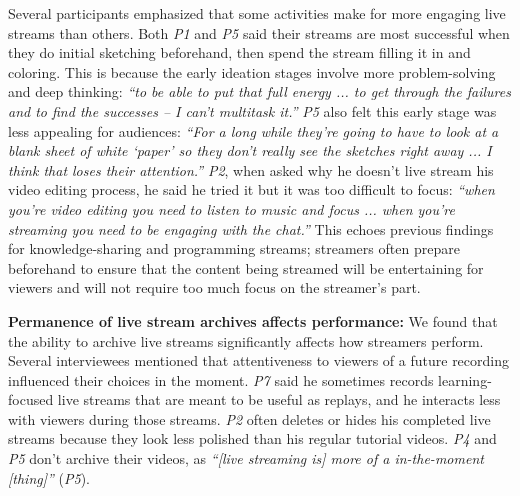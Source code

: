 Several participants emphasized that some activities make for more engaging live streams than others. Both \textit{P1} and \textit{P5} said their streams are most successful when they do initial sketching beforehand, then spend the stream filling it in and coloring. This is because the early ideation stages involve more problem-solving and deep thinking: \textit{``to be able to put that full energy ... to get through the failures and to find the successes -- I can't multitask it.''} \textit{P5} also felt this early stage was less appealing for audiences: \textit{``For a long while they're going to have to look at a blank sheet of white `paper' so they don't really see the sketches right away ... I think that loses their attention.''} \textit{P2}, when asked why he doesn't live stream his video editing process, he said he tried it but it was too difficult to focus: \textit{``when you're video editing you need to listen to music and focus ... when you're streaming you need to be engaging with the chat.''} This echoes previous findings for knowledge-sharing \cite{Lu2018a} and programming \cite{Faas2018} streams; streamers often prepare beforehand to ensure that the content being streamed will be entertaining for viewers and will not require too much focus on the streamer's part. 


\textbf{Permanence of live stream archives affects performance:}
We found that the ability to archive live streams significantly affects how streamers perform. Several interviewees mentioned that attentiveness to viewers of a future recording influenced their choices in the moment. \textit{P7} said he sometimes records learning-focused live streams that are meant to be useful as replays, and he interacts less with viewers during those streams. \textit{P2} often deletes or hides his completed live streams because they look less polished than his regular tutorial videos. 
\textit{P4} and \textit{P5} don't archive their videos, as \textit{``[live streaming is] more of a in-the-moment [thing]''} (\textit{P5}). 



